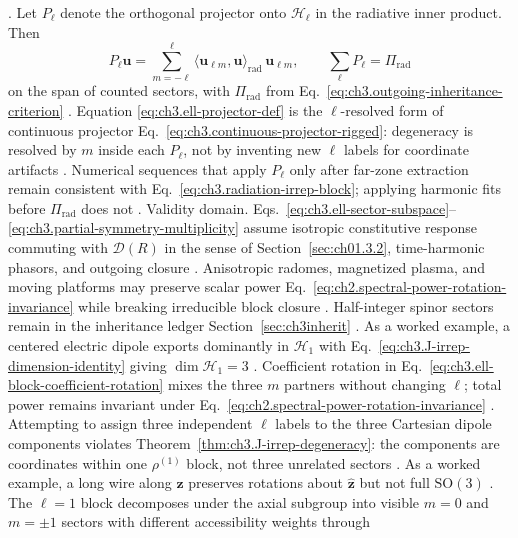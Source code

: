\cite{stratton1941}.
Let \(P_{\ell}\) denote the orthogonal projector onto \(\mathcal{H}_{\ell}\) in the radiative inner product.
Then
\begin{equation}
\label{eq:ch3.ell-projector-def}
P_{\ell}\mathbf{u}
=
\sum_{m=-\ell}^{\ell}
\langle \mathbf{u}_{\ell m},\mathbf{u}\rangle_{\mathrm{rad}}\,\mathbf{u}_{\ell m},
\qquad
\sum_{\ell}P_{\ell}=\Pi_{\mathrm{rad}}
\end{equation}
on the span of counted sectors, with \(\Pi_{\mathrm{rad}}\) from
Eq.~\eqref{eq:ch3.outgoing-inheritance-criterion} \cite{hansen1988}. Equation
\eqref{eq:ch3.ell-projector-def} is the \(\ell\)-resolved form of continuous projector
Eq.~\eqref{eq:ch3.continuous-projector-rigged}: degeneracy is resolved by \(m\) inside each \(P_{\ell}\), not
by inventing new \(\ell\) labels for coordinate artifacts \cite{stratton1941}. Numerical
sequences that apply \(P_{\ell}\) only after far-zone extraction remain consistent with
Eq.~\eqref{eq:ch3.radiation-irrep-block}; applying harmonic fits before \(\Pi_{\mathrm{rad}}\) does not
\cite{harrington2001}.
Validity domain. Eqs.~\eqref{eq:ch3.ell-sector-subspace}--\eqref{eq:ch3.partial-symmetry-multiplicity} assume isotropic
constitutive response commuting with \(\mathcal{D}(R)\) in the sense of Section~\ref{sec:ch01.3.2},
time-harmonic phasors, and outgoing closure \cite{stratton1941}. Anisotropic radomes,
magnetized plasma, and moving platforms may preserve scalar power
Eq.~\eqref{eq:ch2.spectral-power-rotation-invariance} while breaking irreducible block closure
\cite{stratton1941}. Half-integer spinor sectors remain in the inheritance ledger
Section~\ref{sec:ch3inherit} \cite{jackson1999}.
As a worked example, a centered electric dipole exports dominantly in \(\mathcal{H}_{1}\) with
Eq.~\eqref{eq:ch3.J-irrep-dimension-identity} giving \(\dim\mathcal{H}_{1}=3\)
\cite{jackson1999}. Coefficient rotation in
Eq.~\eqref{eq:ch3.ell-block-coefficient-rotation} mixes the three \(m\) partners without changing
\(\ell\); total power remains invariant under
Eq.~\eqref{eq:ch2.spectral-power-rotation-invariance} \cite{stratton1941}. Attempting to assign three
independent \(\ell\) labels to the three Cartesian dipole components violates
Theorem~\ref{thm:ch3.J-irrep-degeneracy}: the components are coordinates within one \(\rho^{(1)}\) block,
not three unrelated sectors \cite{harrington2001}.
As a worked example, a long wire along \(\hat{\mathbf{z}}\) preserves rotations about \(\hat{\mathbf{z}}\) but not full
\(\mathrm{SO}(3)\) \cite{harrington2001}. The \(\ell=1\) block decomposes under the
axial subgroup into visible \(m=0\) and \(m=\pm1\) sectors with different accessibility weights through
